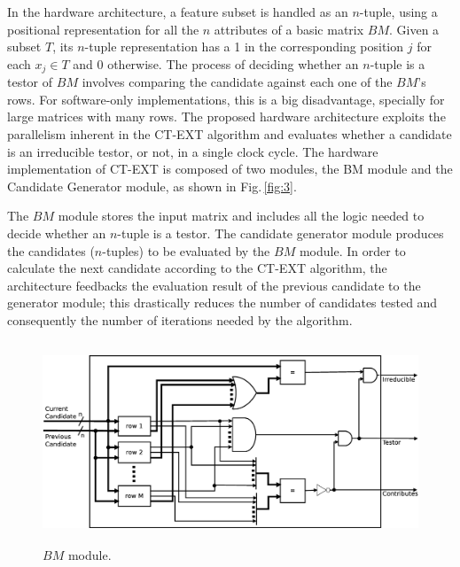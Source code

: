 \documentclass[authoryear,preprint,review,12pt]{elsarticle}
\begin{document}
In the hardware architecture, a feature subset is handled as an $n$-tuple, using a positional 
representation for all the $n$ attributes of a basic matrix $BM$. Given a subset $T$, its $n$-tuple representation 
has a 1 in the corresponding position $j$ for each $x_j \in T$ and 0 otherwise.
The process of deciding whether an $n$-tuple is a testor of $BM$ involves
comparing the candidate against each one of the $BM$'s rows. For
software-only implementations, this is a big disadvantage, specially for large 
matrices with many rows. The proposed hardware architecture exploits the parallelism 
inherent in the CT-EXT algorithm
and evaluates whether a candidate is an irreducible testor, or not, in a single
clock cycle. The hardware implementation of CT-EXT is composed of two modules, the BM module and the Candidate Generator module, as shown in
Fig.\,\ref{fig:3}. 

The $BM$ module stores the input matrix and
includes all the logic needed to decide whether an $n$-tuple is a testor. The candidate
generator module produces the candidates ($n$-tuples) to be
evaluated by the $BM$ module. In order to calculate the next candidate
according to the CT-EXT algorithm, the architecture feedbacks the
evaluation result of the previous candidate to the generator module;
this drastically reduces the number of candidates tested and
consequently the number of iterations needed by the algorithm. 


\begin{figure}[htb]
    \begin{center}
        \includegraphics[height=6cm]{BM_module.eps}
    \end{center}
\caption{$BM$ module.}
\label{fig:4}
\end{figure}
\end{document}
